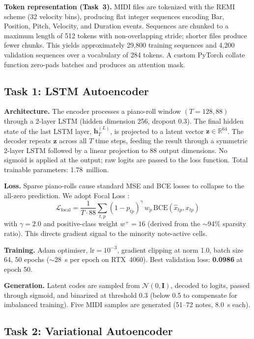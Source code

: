 \documentclass[conference]{IEEEtran}
\begin{document}
\textbf{Token representation (Task~3).}
MIDI files are tokenized with the REMI scheme \cite{miditok} (32 velocity bins), producing flat integer sequences encoding Bar, Position, Pitch, Velocity, and Duration events. Sequences are chunked to a maximum length of 512 tokens with non-overlapping stride; shorter files produce fewer chunks. This yields approximately 29,800 training sequences and 4,200 validation sequences over a vocabulary of 284 tokens. A custom PyTorch collate function zero-pads batches and produces an attention mask.

\subsection{Task 1: LSTM Autoencoder}

\textbf{Architecture.} The encoder processes a piano-roll window $(T{=}128, 88)$ through a 2-layer LSTM (hidden dimension 256, dropout 0.3). The final hidden state of the last LSTM layer, $\mathbf{h}_T^{(L)}$, is projected to a latent vector $\mathbf{z} \in \mathbb{R}^{64}$. The decoder repeats $\mathbf{z}$ across all $T$ time steps, feeding the result through a symmetric 2-layer LSTM followed by a linear projection to 88 output dimensions. No sigmoid is applied at the output; raw logits are passed to the loss function. Total trainable parameters: 1.78~million.

\textbf{Loss.} Sparse piano-rolls cause standard MSE and BCE losses to collapse to the all-zero prediction. We adopt Focal Loss \cite{focal}:
\begin{equation}
\mathcal{L}_{\mathrm{focal}} = \frac{1}{T \cdot 88} \sum_{t,p}
  (1 - p_{tp})^{\gamma}\, w_p\, \mathrm{BCE}(\hat{x}_{tp}, x_{tp})
\label{eq:focal}
\end{equation}
with $\gamma{=}2.0$ and positive-class weight $w^{+}{=}16$ (derived from the $\sim$94\% sparsity ratio). This directs gradient signal to the minority note-active cells.

\textbf{Training.} Adam optimiser, $\mathrm{lr}{=}10^{-3}$, gradient clipping at norm 1.0, batch size 64, 50 epochs ($\sim$28~s per epoch on RTX~4060). Best validation loss: \textbf{0.0986} at epoch 50.

\textbf{Generation.} Latent codes are sampled from $\mathcal{N}(0, \mathbf{I})$, decoded to logits, passed through sigmoid, and binarized at threshold 0.3 (below 0.5 to compensate for imbalanced training). Five MIDI samples are generated (51--72 notes, 8.0~s each).

\subsection{Task 2: Variational Autoencoder}
\end{document}
